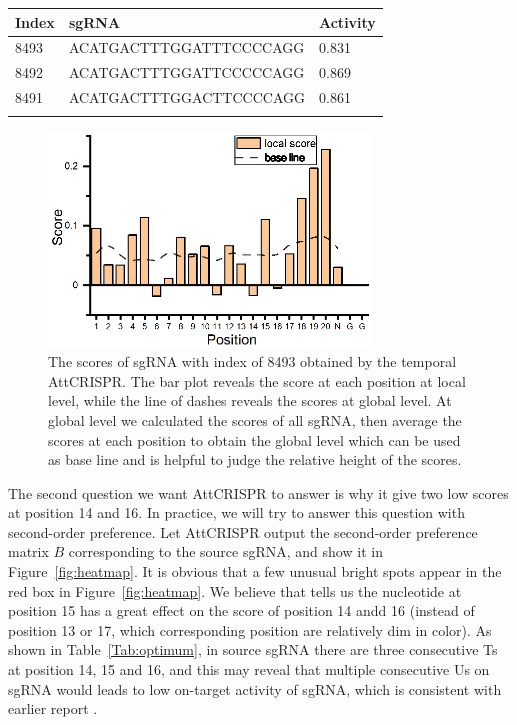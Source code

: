 \documentclass{bioinfo}
\begin{document}
\begin{table}[!tpb]
    {\begin{tabular}{@{}lll@{}}\toprule
        Index & sgRNA & Activity \\\midrule
        8493 & ACATGACTTTGGATTTCCCCAGG & 0.831\\
        8492 & ACATGACTTTGGATTCCCCCAGG & 0.869\\
        8491 & ACATGACTTTGGACTTCCCCAGG & 0.861\\
        \botrule
    \end{tabular}}\footnotesize{}
\end{table}
\begin{figure}[!tpb]
    \centerline{\includegraphics[width=86mm]{local0.eps}}
    \caption{
The scores of sgRNA with index of 8493 obtained by the temporal AttCRISPR. 
The bar plot reveals the score at each position at local level, while the line of dashes reveals the scores at global level. 
At global level we calculated the scores of all sgRNA, then average the scores at each position to obtain the global level which can be used as base line and is helpful to judge the relative height of the scores. 
}\label{fig:opt}
\end{figure}

The second question we want AttCRISPR to answer is why it give two low scores at position 14 and 16. 
In practice, we will try to answer this question with second-order preference. 
Let AttCRISPR output the second-order preference matrix $B$ corresponding to the source sgRNA, and show it in Figure~\ref{fig:heatmap}. 
It is obvious that a few unusual bright spots appear in the red box in Figure~\ref{fig:heatmap}. 
We believe that tells us the nucleotide at position 15 has a great effect on the score of position 14 andd 16 (instead of position 13 or 17, which corresponding position are relatively dim in color). 
As shown in Table~\ref{Tab:optimum}, in source sgRNA there are three consecutive Ts at position 14, 15 and 16, and this may reveal that multiple consecutive Us on sgRNA would leads to low on-target activity of sgRNA, which is consistent with earlier report \citep{wu2014genome-wide}. 
\end{document}
